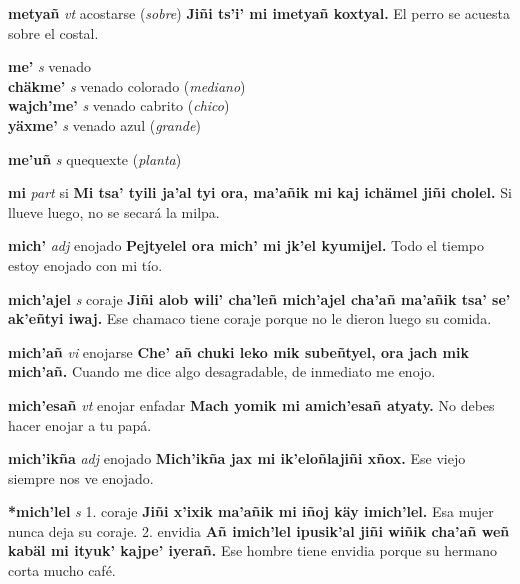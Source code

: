 \documentclass[10pt]{scrbook}
\newcommand{\entry}[1]{\textbf{#1}}
\newcommand{\onedefinition}[1]{#1.}
\newcommand{\partofspeech}[1]{\textit{#1}}
\newcommand{\spanishtranslation}[1]{#1}
\newcommand{\clarification}[1]{(\textit{#1})}
\newcommand{\cholexample}[1]{\textbf{#1}}
\newcommand{\exampletranslation}[1]{#1}
\newcommand{\secondaryentry}[1]{\\\textbf{#1}}
\newcommand{\secondpartofspeech}[1]{\textit{#1}}
\newcommand{\secondtranslation}[1]{#1}
\begin{document}
\begin{multicols}{2}
\entry{metyañ}
\partofspeech{vt}
\spanishtranslation{acostarse}
\clarification{sobre}
\cholexample{Jiñi ts'i' mi imetyañ koxtyal.}
\exampletranslation{El perro se acuesta sobre el costal.}

\entry{me'}
\partofspeech{s}
\spanishtranslation{venado}
\secondaryentry{chäkme'}
\secondpartofspeech{s}
\secondtranslation{venado colorado}
\clarification{mediano}
\secondaryentry{wajch'me'}
\secondpartofspeech{s}
\secondtranslation{venado cabrito}
\clarification{chico}
\secondaryentry{yäxme'}
\secondpartofspeech{s}
\secondtranslation{venado azul}
\clarification{grande}

\entry{me'uñ}
\partofspeech{s}
\spanishtranslation{quequexte}
\clarification{planta}

\entry{mi}
\partofspeech{part}
\spanishtranslation{si}
\cholexample{Mi tsa' tyili ja'al tyi ora, ma'añik mi kaj ichämel jiñi cholel.}
\exampletranslation{Si llueve luego, no se secará la milpa.}

\entry{mich'}
\partofspeech{adj}
\spanishtranslation{enojado}
\cholexample{Pejtyelel ora mich' mi jk'el kyumijel.}
\exampletranslation{Todo el tiempo estoy enojado con mi tío.}

\entry{mich'ajel}
\partofspeech{s}
\spanishtranslation{coraje}
\cholexample{Jiñi alob wili' cha'leñ mich'ajel cha'añ ma'añik tsa' se' ak'eñtyi iwaj.}
\exampletranslation{Ese chamaco tiene coraje porque no le dieron luego su comida.}

\entry{mich'añ}
\partofspeech{vi}
\spanishtranslation{enojarse}
\cholexample{Che' añ chuki leko mik subeñtyel, ora jach mik mich'añ.}
\exampletranslation{Cuando me dice algo desagradable, de inmediato me enojo.}

\entry{mich'esañ}
\partofspeech{vt}
\spanishtranslation{enojar}
\spanishtranslation{enfadar}
\cholexample{Mach yomik mi amich'esañ atyaty.}
\exampletranslation{No debes hacer enojar a tu papá.}

\entry{mich'ikña}
\partofspeech{adj}
\spanishtranslation{enojado}
\cholexample{Mich'ikña jax mi ik'eloñlajiñi xñox.}
\exampletranslation{Ese viejo siempre nos ve enojado.}

\entry{*mich'lel}
\partofspeech{s}
\onedefinition{1}
\spanishtranslation{coraje}
\cholexample{Jiñi x'ixik ma'añik mi iñoj käy imich'lel.}
\exampletranslation{Esa mujer nunca deja su coraje.}
\onedefinition{2}
\spanishtranslation{envidia}
\cholexample{Añ imich'lel ipusik'al jiñi wiñik cha'añ weñ kabäl mi ityuk' kajpe' iyerañ.}
\exampletranslation{Ese hombre tiene envidia porque su hermano corta mucho café.}


\end{multicols}
\end{document}
